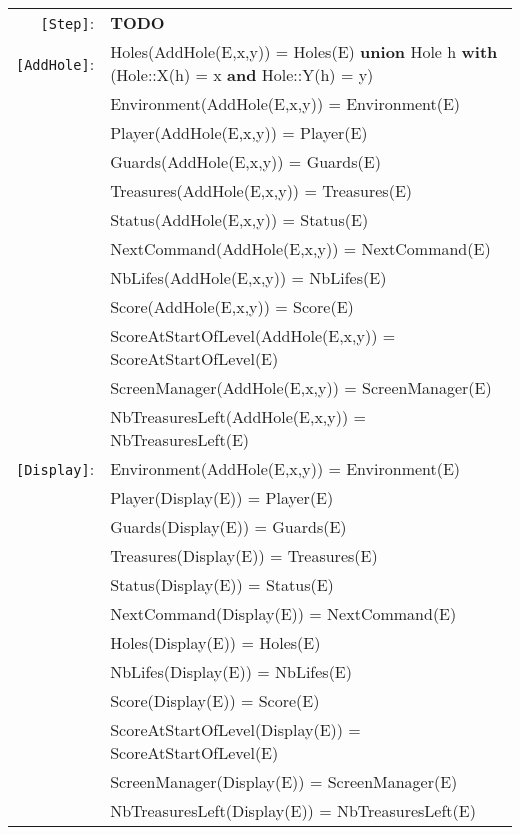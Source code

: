 \documentclass[7pt]{article}
\begin{document}
\begin{tabular}{rl}
       \texttt{[Step]}: & \textbf{TODO\
} \\
    \texttt{[AddHole]}: & Holes(AddHole(E,x,y)) = Holes(E) \textbf{union} Hole h \textbf{ with} (Hole::X(h) = x \textbf{and} Hole::Y(h) = y) \\
       & Environment(AddHole(E,x,y)) = Environment(E) \\
       & Player(AddHole(E,x,y)) = Player(E) \\
       & Guards(AddHole(E,x,y)) = Guards(E) \\
       & Treasures(AddHole(E,x,y)) = Treasures(E) \\
       & Status(AddHole(E,x,y)) = Status(E) \\
       & NextCommand(AddHole(E,x,y)) = NextCommand(E) \\
       & NbLifes(AddHole(E,x,y)) = NbLifes(E) \\
       & Score(AddHole(E,x,y)) = Score(E) \\
       & ScoreAtStartOfLevel(AddHole(E,x,y)) = ScoreAtStartOfLevel(E) \\
       & ScreenManager(AddHole(E,x,y)) = ScreenManager(E) \\
       & NbTreasuresLeft(AddHole(E,x,y)) = NbTreasuresLeft(E) \\
       
       \texttt{[Display]}: & Environment(AddHole(E,x,y)) = Environment(E) \\
       & Player(Display(E)) = Player(E) \\
       & Guards(Display(E)) = Guards(E) \\
       & Treasures(Display(E)) = Treasures(E) \\
       & Status(Display(E)) = Status(E) \\
       & NextCommand(Display(E)) = NextCommand(E) \\
       & Holes(Display(E)) = Holes(E) \\
       & NbLifes(Display(E)) = NbLifes(E) \\
       & Score(Display(E)) = Score(E) \\
       & ScoreAtStartOfLevel(Display(E)) = ScoreAtStartOfLevel(E) \\
       & ScreenManager(Display(E)) = ScreenManager(E) \\
       & NbTreasuresLeft(Display(E)) = NbTreasuresLeft(E) \\

\end{tabular}
\newpage
\end{document}

